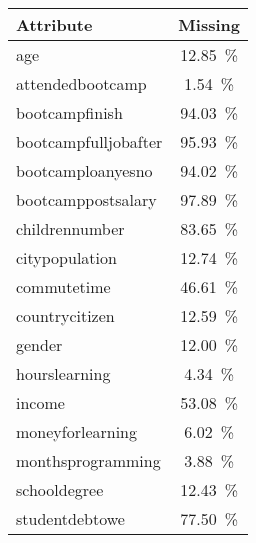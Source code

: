 \begin{tabular}{lS[table-format=2.2]}
\toprule
\textbf{Attribute} &  \textbf{Missing} \\
\midrule
age &      12.85\ \% \\
attendedbootcamp &       1.54\ \% \\
bootcampfinish &      94.03\ \% \\
bootcampfulljobafter &      95.93\ \% \\
bootcamploanyesno &      94.02\ \% \\
bootcamppostsalary &      97.89\ \% \\
childrennumber &      83.65\ \% \\
citypopulation &      12.74\ \% \\
commutetime &      46.61\ \% \\
countrycitizen &      12.59\ \% \\
gender &      12.00\ \% \\
hourslearning &       4.34\ \% \\
income &      53.08\ \% \\
moneyforlearning &       6.02\ \% \\
monthsprogramming &       3.88\ \% \\
schooldegree &      12.43\ \% \\
studentdebtowe &      77.50\ \% \\
\bottomrule
\end{tabular}

